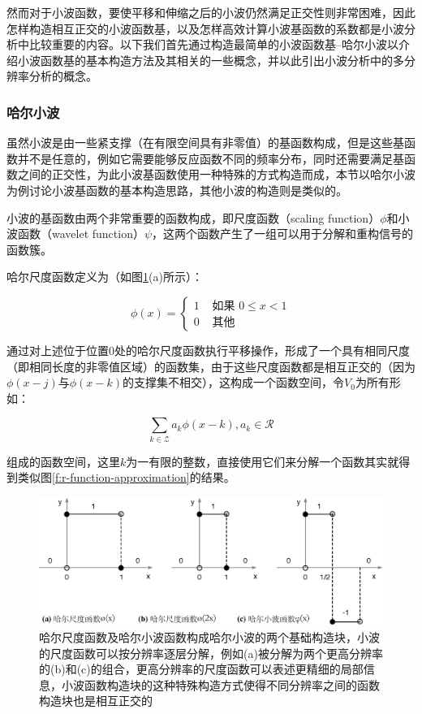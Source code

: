 然而对于小波函数，要使平移和伸缩之后的小波仍然满足正交性则非常困难，因此怎样构造相互正交的小波函数基，以及怎样高效计算小波基函数的系数都是小波分析中比较重要的内容。以下我们首先通过构造最简单的小波函数基--哈尔小波以介绍小波函数基的基本构造方法及其相关的一些概念，并以此引出小波分析中的多分辨率分析的概念。




\subsubsection{哈尔小波}\label{sec:r-haar-wavelet}
虽然小波是由一些紧支撑（在有限空间具有非零值）的基函数构成，但是这些基函数并不是任意的，例如它需要能够反应函数不同的频率分布，同时还需要满足基函数之间的正交性，为此小波基函数使用一种特殊的方式构造而成，本节以哈尔小波为例讨论小波基函数的基本构造思路，其他小波的构造则是类似的。

小波的基函数由两个非常重要的函数构成，即尺度函数（scaling function）$\phi$和小波函数（wavelet function）$\psi$，这两个函数产生了一组可以用于分解和重构信号的函数簇。

哈尔尺度函数定义为（如图\ref{f:r-haar-functions}(a)所示）：

\begin{equation}
	\phi(x)=\begin{cases}
		1 & \text{ 如果 } 0\leq x<1\\
		0 & \text{ 其他 }
	\end{cases}
\end{equation}

通过对上述位于位置0处的哈尔尺度函数执行平移操作，形成了一个具有相同尺度（即相同长度的非零值区域）的函数集，由于这些尺度函数都是相互正交的（因为$\phi(x-j)$与$\phi(x-k)$的支撑集不相交），这构成一个函数空间，令$V_0$为所有形如：

\begin{equation}
	\sum_{k\in \mathcal{Z}}a_k\phi(x-k),a_k\in \mathcal{R}
\end{equation}

\noindent 组成的函数空间，这里$k$为一有限的整数，直接使用它们来分解一个函数其实就得到类似图\ref{f:r-function-approximation}的结果。

\begin{figure}
	\includegraphics[width=1.0\textwidth]{figures/r/haar-functions}
	\caption{哈尔尺度函数及哈尔小波函数构成哈尔小波的两个基础构造块，小波的尺度函数可以按分辨率逐层分解，例如(a)被分解为两个更高分辨率的(b)和(c)的组合，更高分辨率的尺度函数可以表述更精细的局部信息，小波函数构造块的这种特殊构造方式使得不同分辨率之间的函数构造块也是相互正交的}
	\label{f:r-haar-functions}
\end{figure}

